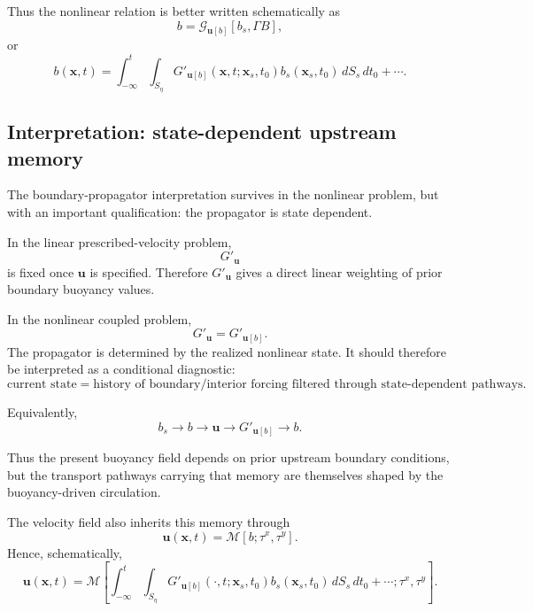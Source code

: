 \documentclass[10pt]{amsart}
\begin{document}
Thus the nonlinear relation is better written schematically as
\begin{equation}
b
=
\mathcal G_{\mathbf u[b]}[b_s,\Gamma B],
\end{equation}
or
\begin{equation}
b(\mathbf x,t)
=
\int_{-\infty}^{t}\int_{S_\eta}
G'_{\mathbf u[b]}(\mathbf x,t;\mathbf x_s,t_0)
b_s(\mathbf x_s,t_0)
\,dS_s\,dt_0
+\cdots.
\end{equation}

\subsection{Interpretation: state-dependent upstream memory}

The boundary-propagator interpretation survives in the nonlinear problem, but with an important qualification: the propagator is state dependent.

In the linear prescribed-velocity problem,
\begin{equation}
G'_{\mathbf u}
\end{equation}
is fixed once \(\mathbf u\) is specified. Therefore \(G'_{\mathbf u}\) gives a direct linear weighting of prior boundary buoyancy values.

In the nonlinear coupled problem,
\begin{equation}
G'_{\mathbf u}=G'_{\mathbf u[b]}.
\end{equation}
The propagator is determined by the realized nonlinear state. It should therefore be interpreted as a conditional diagnostic:
\[
\text{current state}
=
\text{history of boundary/interior forcing filtered through state-dependent pathways}.
\]

Equivalently,
\begin{equation}
b_s
\longrightarrow b
\longrightarrow \mathbf u
\longrightarrow G'_{\mathbf u[b]}
\longrightarrow b.
\end{equation}

Thus the present buoyancy field depends on prior upstream boundary conditions, but the transport pathways carrying that memory are themselves shaped by the buoyancy-driven circulation.

The velocity field also inherits this memory through
\begin{equation}
\mathbf u(\mathbf x,t)
=
\mathcal M[b;\tau^x,\tau^y].
\end{equation}
Hence, schematically,
\begin{equation}
\mathbf u(\mathbf x,t)
=
\mathcal M
\left[
\int_{-\infty}^{t}\int_{S_\eta}
G'_{\mathbf u[b]}(\cdot,t;\mathbf x_s,t_0)
b_s(\mathbf x_s,t_0)
\,dS_s\,dt_0
+\cdots
;\tau^x,\tau^y
\right].
\end{equation}
\end{document}

